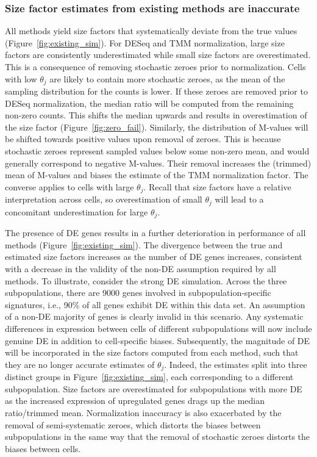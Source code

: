\documentclass{bmcart}
\begin{document}
\subsubsection*{Size factor estimates from existing methods are inaccurate}
All methods yield size factors that systematically deviate from the true values (Figure~\ref{fig:existing_sim}).
For DESeq and TMM normalization, large size factors are consistently underestimated while small size factors are overestimated.
This is a consequence of removing stochastic zeroes prior to normalization.
Cells with low $\theta_j$ are likely to contain more stochastic zeroes, as the mean of the sampling distribution for the counts is lower.
If these zeroes are removed prior to DESeq normalization, the median ratio will be computed from the remaining non-zero counts.
This shifts the median upwards and results in overestimation of the size factor (Figure~\ref{fig:zero_fail}).
Similarly, the distribution of M-values will be shifted towards positive values upon removal of zeroes.
This is because stochastic zeroes represent sampled values below some non-zero mean, and would generally correspond to negative M-values.
Their removal increases the (trimmed) mean of M-values and biases the estimate of the TMM normalization factor.
The converse applies to cells with large $\theta_j$.
Recall that size factors have a relative interpretation across cells, so overestimation of small $\theta_j$ will lead to a concomitant underestimation for large $\theta_j$.

The presence of DE genes results in a further deterioration in performance of all methods (Figure~\ref{fig:existing_sim}).
The divergence between the true and estimated size factors increases as the number of DE genes increases,
    consistent with a decrease in the validity of the non-DE assumption required by all methods.
To illustrate, consider the strong DE simulation.
Across the three subpopulations, there are 9000 genes involved in subpopulation-specific signatures, i.e., 90\% of all genes exhibit DE within this data set.
An assumption of a non-DE majority of genes is clearly invalid in this scenario.
Any systematic differences in expression between cells of different subpopulations will now include genuine DE in addition to cell-specific biases.
Subsequently, the magnitude of DE will be incorporated in the size factors computed from each method, such that they are no longer accurate estimates of $\theta_j$.
Indeed, the estimates split into three distinct groups in Figure~\ref{fig:existing_sim}, each corresponding to a different subpopulation.
Size factors are overestimated for subpopulations with more DE as the increased expression of upregulated genes drags up the median ratio/trimmed mean.
Normalization inaccuracy is also exacerbated by the removal of semi-systematic zeroes, which distorts the biases between subpopulations in the same way that the removal of stochastic zeroes distorts the biases between cells.
\end{document}
